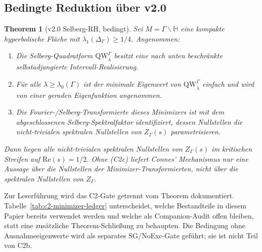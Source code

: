 \documentclass[12pt,a4paper]{article}
\newtheorem{theorem}{Theorem}[section]
\theoremstyle{definition}
\theoremstyle{remark}
\newcommand{\HH}{\mathbb{H}}
\newcommand{\QW}{\mathrm{QW}}
\newcommand{\Sel}{Z_{\Gamma}}
\newcommand{\Delop}{\Delta_{\Gamma}}
\begin{document}
\subsection{Bedingte Reduktion über v2.0}

\begin{theorem}[v2.0 Selberg-RH, bedingt]
\label{thm:v2-Sel-RH}
Sei $M = \Gamma\backslash\HH$ eine kompakte hyperbolische Fläche mit
$\lambda_1(\Delop) \ge 1/4$.  Angenommen:
\begin{enumerate}[label=(C2\alph*)]
  \item Die Selberg-Quadratform $\QW^\Gamma_\lambda$ besitzt eine nach unten
    beschränkte selbstadjungierte Intervall-Realisierung.
  \item Für alle $\lambda \ge \lambda_0(\Gamma)$ ist der minimale Eigenwert
    von $\QW^\Gamma_\lambda$ einfach und wird von einer geraden Eigenfunktion
    angenommen.
  \item Die Fourier-/Selberg-Transformierte dieses Minimizers ist mit dem
    abgeschlossenen Selberg-Spektralfaktor identifiziert, dessen Nullstellen die
    nicht-trivialen spektralen Nullstellen von $\Sel(s)$ parametrisieren.
\end{enumerate}
Dann liegen alle nicht-trivialen spektralen Nullstellen von $\Sel(s)$ im
kritischen Streifen auf $\mathrm{Re}(s) = 1/2$. Ohne (C2c) liefert Connes'
Mechanismus nur eine Aussage über die Nullstellen der Minimizer-Transformierten,
nicht über die spektralen Nullstellen von $\Sel$.
\end{theorem}

Zur Leserführung wird das C2-Gate getrennt vom Theorem dokumentiert.
Tabelle~\ref{tab:c2-minimizer-ledger} unterscheidet, welche Bestandteile in
diesem Papier bereits verwendet werden und welche als Companion-Audit offen
bleiben, statt eine zusätzliche Theorem-Schließung zu behaupten. Die
Bedingung ohne Ausnahmeeigenwerte wird als separates SG/NoExc-Gate geführt;
sie ist nicht Teil von C2b.
\end{document}
